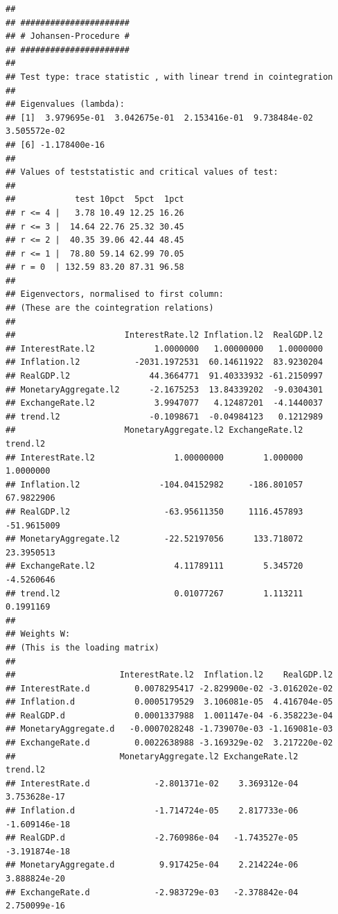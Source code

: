 \documentclass[11pt,preprint, authoryear]{elsarticle}
\numberwithin{equation}{section}
\numberwithin{figure}{section}
\numberwithin{table}{section}
\begin{document}
\begin{verbatim}
## 
## ###################### 
## # Johansen-Procedure # 
## ###################### 
## 
## Test type: trace statistic , with linear trend in cointegration 
## 
## Eigenvalues (lambda):
## [1]  3.979695e-01  3.042675e-01  2.153416e-01  9.738484e-02  3.505572e-02
## [6] -1.178400e-16
## 
## Values of teststatistic and critical values of test:
## 
##            test 10pct  5pct  1pct
## r <= 4 |   3.78 10.49 12.25 16.26
## r <= 3 |  14.64 22.76 25.32 30.45
## r <= 2 |  40.35 39.06 42.44 48.45
## r <= 1 |  78.80 59.14 62.99 70.05
## r = 0  | 132.59 83.20 87.31 96.58
## 
## Eigenvectors, normalised to first column:
## (These are the cointegration relations)
## 
##                      InterestRate.l2 Inflation.l2  RealGDP.l2
## InterestRate.l2            1.0000000   1.00000000   1.0000000
## Inflation.l2           -2031.1972531  60.14611922  83.9230204
## RealGDP.l2                44.3664771  91.40333932 -61.2150997
## MonetaryAggregate.l2      -2.1675253  13.84339202  -9.0304301
## ExchangeRate.l2            3.9947077   4.12487201  -4.1440037
## trend.l2                  -0.1098671  -0.04984123   0.1212989
##                      MonetaryAggregate.l2 ExchangeRate.l2    trend.l2
## InterestRate.l2                1.00000000        1.000000   1.0000000
## Inflation.l2                -104.04152982     -186.801057  67.9822906
## RealGDP.l2                   -63.95611350     1116.457893 -51.9615009
## MonetaryAggregate.l2         -22.52197056      133.718072  23.3950513
## ExchangeRate.l2                4.11789111        5.345720  -4.5260646
## trend.l2                       0.01077267        1.113211   0.1991169
## 
## Weights W:
## (This is the loading matrix)
## 
##                     InterestRate.l2  Inflation.l2    RealGDP.l2
## InterestRate.d         0.0078295417 -2.829900e-02 -3.016202e-02
## Inflation.d            0.0005179529  3.106081e-05  4.416704e-05
## RealGDP.d              0.0001337988  1.001147e-04 -6.358223e-04
## MonetaryAggregate.d   -0.0007028248 -1.739070e-03 -1.169081e-03
## ExchangeRate.d         0.0022638988 -3.169329e-02  3.217220e-02
##                     MonetaryAggregate.l2 ExchangeRate.l2      trend.l2
## InterestRate.d             -2.801371e-02    3.369312e-04  3.753628e-17
## Inflation.d                -1.714724e-05    2.817733e-06 -1.609146e-18
## RealGDP.d                  -2.760986e-04   -1.743527e-05 -3.191874e-18
## MonetaryAggregate.d         9.917425e-04    2.214224e-06  3.888824e-20
## ExchangeRate.d             -2.983729e-03   -2.378842e-04  2.750099e-16
\end{verbatim}
\end{document}
